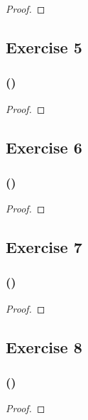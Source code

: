 \documentclass[14pt]{extarticle}
\begin{document}
\begin{proof}

\end{proof}

\subsection{Exercise 5}

\subsubsection{()}

\begin{proof}

\end{proof}

\subsection{Exercise 6}

\subsubsection{()}

\begin{proof}

\end{proof}

\subsection{Exercise 7}

\subsubsection{()}

\begin{proof}

\end{proof}

\subsection{Exercise 8}

\subsubsection{()}

\begin{proof}

\end{proof}
\end{document}
